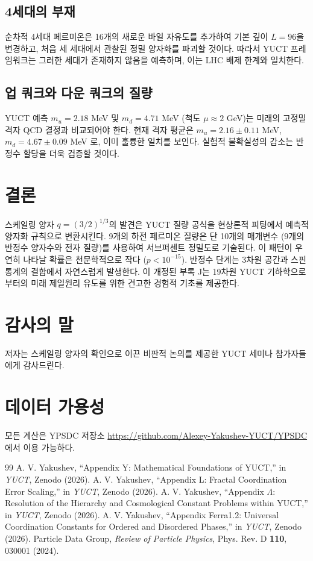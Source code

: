 \documentclass[12pt,a4paper]{article}
\begin{document}
	\subsection{4세대의 부재}
	
	순차적 4세대 페르미온은 16개의 새로운 바일 자유도를 추가하여 기본 깊이 \(L=96\)을 변경하고, 처음 세 세대에서 관찰된 정밀 양자화를 파괴할 것이다. 따라서 YUCT 프레임워크는 그러한 세대가 존재하지 않음을 예측하며, 이는 LHC 배제 한계와 일치한다.
	
	\subsection{업 쿼크와 다운 쿼크의 질량}
	
	YUCT 예측 \(m_u = 2.18\) MeV 및 \(m_d = 4.71\) MeV (척도 \(\mu \approx 2\) GeV)는 미래의 고정밀 격자 QCD 결정과 비교되어야 한다. 현재 격자 평균은 \(m_u = 2.16 \pm 0.11\) MeV, \(m_d = 4.67 \pm 0.09\) MeV \cite{PDG2024}로, 이미 훌륭한 일치를 보인다. 실험적 불확실성의 감소는 반정수 할당을 더욱 검증할 것이다.
	
	\section{결론}
	
	스케일링 양자 \(q = (3/2)^{1/3}\)의 발견은 YUCT 질량 공식을 현상론적 피팅에서 예측적 양자화 규칙으로 변환시킨다. 9개의 하전 페르미온 질량은 단 10개의 매개변수 (9개의 반정수 양자수와 전자 질량)를 사용하여 서브퍼센트 정밀도로 기술된다. 이 패턴이 우연히 나타날 확률은 천문학적으로 작다 (\(p < 10^{-15}\)). 반정수 단계는 3차원 공간과 스핀 통계의 결합에서 자연스럽게 발생한다. 이 개정된 부록 J는 19차원 YUCT 기하학으로부터의 미래 제일원리 유도를 위한 견고한 경험적 기초를 제공한다.
	
	\section*{감사의 말}
	저자는 스케일링 양자의 확인으로 이끈 비판적 논의를 제공한 YUCT 세미나 참가자들에게 감사드린다.
	
	\section*{데이터 가용성}
	모든 계산은 YPSDC 저장소 \url{https://github.com/Alexey-Yakushev-YUCT/YPSDC}에서 이용 가능하다.
	
	\begin{thebibliography}{99}
		 A. V. Yakushev, ``Appendix Y: Mathematical Foundations of YUCT,'' in \emph{YUCT}, Zenodo (2026).
		 A. V. Yakushev, ``Appendix L: Fractal Coordination Error Scaling,'' in \emph{YUCT}, Zenodo (2026).
		 A. V. Yakushev, ``Appendix \(\Lambda\): Resolution of the Hierarchy and Cosmological Constant Problems within YUCT,'' in \emph{YUCT}, Zenodo (2026).
		 A. V. Yakushev, ``Appendix Ferra1.2: Universal Coordination Constants for Ordered and Disordered Phases,'' in \emph{YUCT}, Zenodo (2026).
		 Particle Data Group, \emph{Review of Particle Physics}, Phys. Rev. D \textbf{110}, 030001 (2024).
	\end{thebibliography}
	
\end{document}
